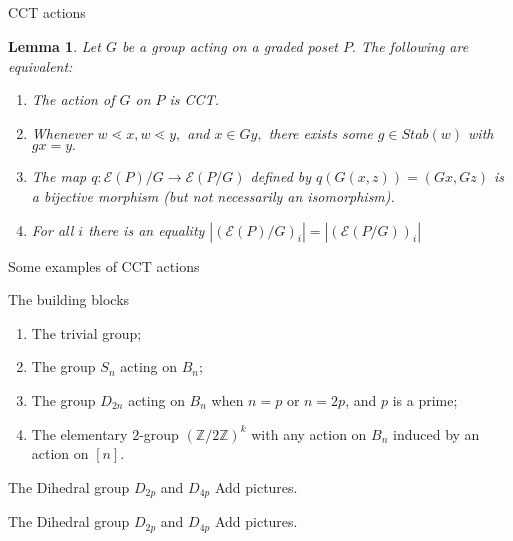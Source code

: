 \documentclass{beamer}
\newtheorem{lem}[thm]{Lemma}
\theoremstyle{remark}
\begin{document}
\subsection{}
\begin{frame}{CCT actions}
\begin{lem}
\label{lem:cover_transitive_equivalence}
Let $G$ be a group acting on a graded poset $P.$ The following are equivalent:
\begin{enumerate}
	\item The action of $G$ on $P$ is CCT.
	\item Whenever $w \lessdot x,w \lessdot y,$ and $x \in Gy,$ there exists some $g \in Stab(w)$ with $gx = y.$
	\item The map $q\colon \mathcal E(P)/G\rightarrow \mathcal E(P/G)$ defined by $q(G(x, z)) = (Gx,Gz)$ is a bijective morphism (but not necessarily an isomorphism).
	\item For all $i$ there is an equality $|(\mathcal E(P)/G)_i|=| (\mathcal E(P/G))_i|$
\end{enumerate}
\end{lem}
\end{frame}





\begin{frame}{Some examples of CCT actions}
\begin{block}{The building blocks}
\begin{enumerate}
\item The trivial group;
\pause
\item The group $S_n$ acting on $B_n$;
\pause
\item The group $D_{2n}$ acting on $B_{n}$ when $n = p$ or $n = 2p$, and $p$ is a prime;
\pause
\item The elementary $2$-group $(\mathbb Z /2 \mathbb Z)^k$ with any action on $B_n$ induced by an action on $[n]$.
\end{enumerate}
\end{block}
\end{frame}





\begin{frame}{The Dihedral group $D_{2p}$ and $D_{4p}$}
Add pictures.
\end{frame}





\begin{frame}{The Dihedral group $D_{2p}$ and $D_{4p}$}
Add pictures.
\end{frame}
\end{document}
